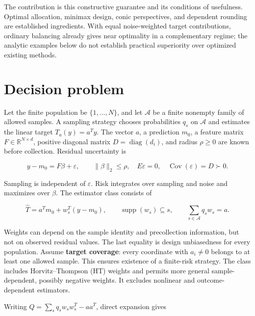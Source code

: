 \documentclass[11pt]{article}
\begin{document}
The contribution is this constructive guarantee and its conditions of
usefulness. Optimal allocation, minimax design, conic perspectives, and
dependent rounding are established ingredients. With equal noise-weighted
target contributions, ordinary balancing already gives near optimality
in a complementary regime; the analytic
examples below do not establish practical superiority over optimized
existing methods.

\section{Decision problem}\label{decision-problem}

Let the finite population be \(\{1,\ldots,N\}\), and let \(\mathcal A\)
be a finite nonempty family of allowed samples. A sampling strategy
chooses probabilities \(q_s\) on \(\mathcal A\) and estimates the linear
target \(T_a(y)=a^Ty\). The vector \(a\), a prediction \(m_0\), a
feature matrix \(F\in\mathbb R^{N\times d}\), positive diagonal matrix
\(D=\operatorname{diag}(d_i)\), and radius \(\rho\ge0\) are known before
collection. Residual uncertainty is

\begin{equation}\label{eq:1}
y-m_0=F\beta+\varepsilon,\qquad
\|\beta\|_2\le\rho,\quad E\varepsilon=0,\quad
\operatorname{Cov}(\varepsilon)=D\succ0. 
\end{equation}

Sampling is independent of \(\varepsilon\). Risk integrates over
sampling and noise and maximizes over \(\beta\). The estimator class
consists of

\begin{equation}\label{eq:2}
\widehat T=a^Tm_0+w_s^T(y-m_0),\qquad
\operatorname{supp}(w_s)\subseteq s,\qquad
\sum_{s\in\mathcal A}q_sw_s=a. 
\end{equation}

Weights can depend on the sample identity and precollection information,
but not on observed residual values. The last equality is design
unbiasedness for every population. Assume \textbf{target coverage}:
every coordinate with \(a_i\ne0\) belongs to at least one allowed
sample. This ensures existence of a finite-risk strategy. The class
includes Horvitz--Thompson (HT) weights and permits more general
sample-dependent, possibly negative weights. It excludes nonlinear and
outcome-dependent estimators.

Writing \(Q=\sum_s q_sw_sw_s^T-aa^T\), direct expansion gives
\end{document}
